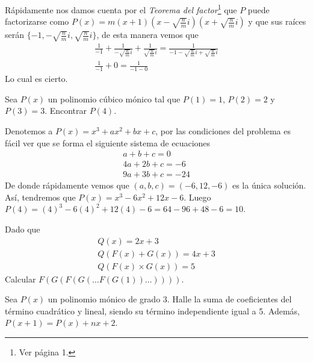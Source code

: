 {\begin{exercise}
        \solution
        {
            Rápidamente nos damos cuenta por el \textit{Teorema del factor}\footnote{Ver \cite{TD23-clase2} página 1.} que
            $P$ puede factorizarse como $P(x) = m(x + 1)(x - \sqrt {\frac{n}{m}}i)(x + \sqrt {\frac{n}{m}}i)$ y
            que sus raíces serán $\{ -1, -\sqrt {\frac{n}{m}}i, \sqrt {\frac{n}{m}}i\}$, de esta manera vemos que
            \begin{gather*}
                \frac{1}{-1} + \frac{1}{-\sqrt {\frac{n}{m}}i} + \frac{1}{\sqrt {\frac{n}{m}}i} = \frac{1}{ -1 - \sqrt {\frac{n}{m}}i + \sqrt {\frac{n}{m}}i}\\
                \frac{1}{-1} + 0 = \frac{1}{ -1 - 0}
            \end{gather*}
            Lo cual es cierto.
        }
    \end{exercise}
    \vspace{2mm}
    \begin{exercise}
        Sea $P(x)$ un polinomio cúbico mónico tal que $P(1) = 1$, $P(2) = 2$ y $P(3) = 3$. Encontrar $P(4).$

        \solution
        {
            Denotemos a $P(x) = x^3 + ax^2 + bx +  c$, por las condiciones del problema es fácil ver que se forma el siguiente sistema de ecuaciones
            \begin{align}
                a + b + c = 0 \\
                4a + 2b + c = -6 \\
                9a + 3b + c = -24
            \end{align}
            De donde rápidamente vemos que $(a, b, c) = (-6, 12, -6)$ es la única solución. Así, tendremos que $P(x) = x^3 - 6x^2 + 12x - 6$.
            Luego $P(4) = (4)^3 - 6(4)^2 + 12(4) - 6 = 64 - 96 + 48 - 6 = 10$.
        }
    \end{exercise}


    \begin{exercise}
        Dado que
        \begin{gather*}
            Q(x) = 2x + 3 \\
            Q( F(x) + G(x) ) = 4x + 3 \\
            Q( F(x) \times G(x) ) = 5
        \end{gather*}
        Calcular $F(G(F(G(\dots F(G(1))\dots))))$.
    \end{exercise}

    \begin{exercise}
        Sea $P(x)$ un polinomio mónico de grado 3.
        Halle la suma de coeficientes del término cuadrático y lineal, siendo su término independiente igual a 5.
        Además, $P(x + 1) = P(x) + nx + 2$.
    \end{exercise}

}
